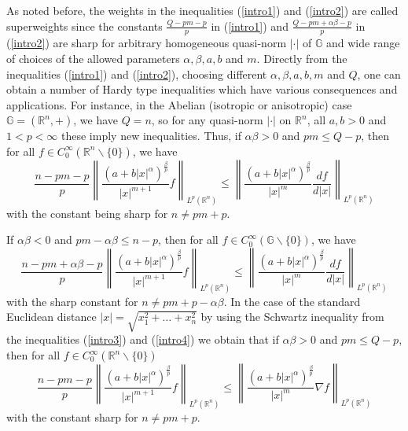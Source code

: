 \documentclass[a4paper,12pt,reqno]{amsart}
\renewcommand\eqref[1]{(\ref{#1})} %
\numberwithin{equation}{section}
\theoremstyle{plain}
\theoremstyle{definition}
\begin{document}
As noted before, the weights in the inequalities \eqref{intro1} and \eqref{intro2} are called superweights since the constants $\frac{Q-pm-p}{p}$ in \eqref{intro1} and $\frac{Q-pm+\alpha\beta-p}{p}$ in \eqref{intro2} are sharp for arbitrary homogeneous quasi-norm $|\cdot|$ of $\mathbb{G}$ and wide range of choices of the allowed parameters  $\alpha, \beta, a, b$ and $m$. Directly from the inequalities \eqref{intro1} and \eqref{intro2}, choosing different $\alpha, \beta, a, b, m$ and $Q$, one can obtain a number of Hardy type inequalities which have various consequences
and applications. For instance, in the Abelian (isotropic or anisotropic) case ${\mathbb G}=(\mathbb R^{n},+)$, we have
$Q=n$, so for any quasi-norm $|\cdot|$ on $\mathbb R^{n}$, all $a,b>0$ and $1<p<\infty$ these imply
new inequalities. Thus, if $\alpha \beta>0$ and $pm\leq Q-p$, then for all $f\in C_{0}^{\infty}(\mathbb R^{n}\backslash\{0\})$, we have
\begin{equation}\label{intro3} \frac{n-pm-p}{p}
\left\|\frac{(a+b|x|^{\alpha})^{\frac{\beta}{p}}}{|x|^{m+1}}f\right\|_{L^{p}(\mathbb R^{n})}
\leq\left\|\frac{(a+b|x|^{\alpha})^{\frac{\beta}{p}}}{|x|^{m}}\frac{df}{d|x|}\right\|_{L^{p}(\mathbb R^{n})}
\end{equation}
with the constant being sharp for $n\neq pm+p$.

If $\alpha \beta<0$ and $pm-\alpha\beta\leq n-p$, then for all $f\in C_{0}^{\infty}(\mathbb{G}\backslash\{0\})$, we have
\begin{equation} \label{intro4}
\frac{n-pm+\alpha\beta-p}{p}
\left\|\frac{(a+b|x|^{\alpha})^{\frac{\beta}{p}}}{|x|^{m+1}}f\right\|_{L^{p}(\mathbb R^{n})}
\leq\left\|\frac{(a+b|x|^{\alpha})^{\frac{\beta}{p}}}{|x|^{m}}\frac{df}{d|x|} \right\|_{L^{p}(\mathbb R^{n})}
\end{equation}
with the sharp constant for $n\neq pm+p-\alpha\beta$.
In the case of the standard Euclidean distance $|x|=\sqrt{x^{2}_{1}+\ldots+x^{2}_{n}}$ by using the Schwartz inequality from the inequalities \eqref{intro3} and \eqref{intro4} we obtain that
if $\alpha \beta>0$ and $pm\leq Q-p$, then for all $f\in C_{0}^{\infty}(\mathbb R^{n}\backslash\{0\})$
\begin{equation}\label{intro5} \frac{n-pm-p}{p}
\left\|\frac{(a+b|x|^{\alpha})^{\frac{\beta}{p}}}{|x|^{m+1}}f\right\|_{L^{p}(\mathbb R^{n})}
\leq\left\|\frac{(a+b|x|^{\alpha})^{\frac{\beta}{p}}}{|x|^{m}}\nabla f\right\|_{L^{p}(\mathbb R^{n})}
\end{equation}
with the constant sharp for $n\neq pm+p$.
\end{document}
